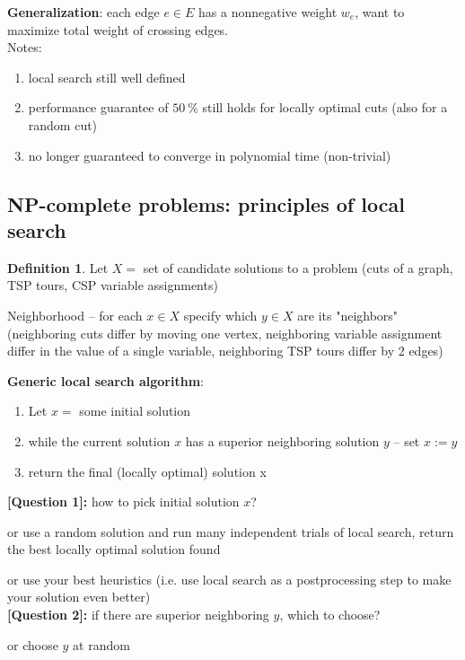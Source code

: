 \documentclass[a4paper,12pt]{article}
\theoremstyle{plain}
\theoremstyle{definition}
\newtheorem*{definition}{Definition}
\theoremstyle{remark}
\begin{document}
\textbf{Generalization}: each edge $e \in E$ has a nonnegative weight $w_e$, want to maximize total weight of crossing edges.
\\

Notes:
\begin{enumerate}
	\item local search still well defined
	\item performance guarantee of $50~\%$ still holds for locally optimal cuts (also for a random cut)
	\item no longer guaranteed to converge in polynomial time (non-trivial)
\end{enumerate}



\subsection{NP-complete problems: principles of local search}
\begin{definition}
Let $X =$ set of candidate solutions to a problem (cuts of a graph, TSP tours, CSP variable assignments)

Neighborhood -- for each $x \in X$ specify which $y \in X$ are its "neighbors" (neighboring cuts differ by moving one vertex, neighboring variable assignment differ in the value of a single variable, neighboring TSP tours differ by 2 edges)
\end{definition}

\textbf{Generic local search algorithm}:
\begin{enumerate}
	\item Let $x =$ some initial solution
	\item while the current solution $x$ has a superior neighboring solution $y$ -- set $x := y$
	\item return the final (locally optimal) solution x
\end{enumerate}

\textbf{[Question 1]:} how to pick initial solution $x$?

or use a random solution and run many independent trials of local search, return the best locally optimal solution found

or use your best heuristics (i.e. use local search as a postprocessing step to make your solution even better)
\\

\textbf{[Question 2]:} if there are superior neighboring $y$, which to choose?

or choose $y$ at random
\end{document}
